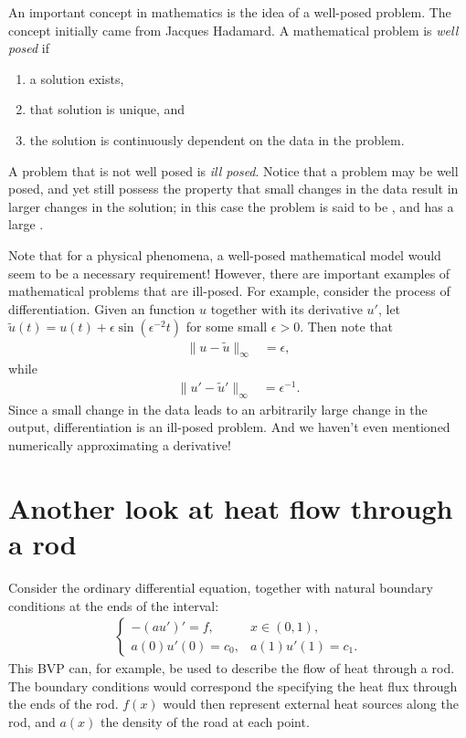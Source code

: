\label{lab:inverse_problems}

An important concept in mathematics is the idea of a well-posed problem. The concept initially came from Jacques Hadamard. A mathematical problem is \textit{well posed} if 
\begin{enumerate}
	\item a solution exists, 
	\item that solution is unique, and 
	\item the solution is continuously dependent on the data in the problem. \label{inverse_problems:continuous_dependence}
\end{enumerate}
A problem that is not well posed is \textit{ill posed}. Notice that a problem may be well posed, and yet still possess the property that small changes in the data result in larger changes in the solution; in this case the problem is said to be , and has a large .

Note that for a physical phenomena, a well-posed mathematical model would seem to be a necessary requirement! However, there are important examples of mathematical problems that are ill-posed. For example, consider the process of differentiation. Given an function $u$ together with its derivative $u'$, let $\tilde{u}(t) = u(t) +  \epsilon \sin(\epsilon^{-2}t)$ for some small $\epsilon > 0$. Then note that 
\begin{align*}
	\|u-\tilde{u}\|_{\infty} &= \epsilon,
\end{align*}
while
\begin{align*}
	\|u'-\tilde{u}'\|_{\infty} &= \epsilon^{-1}.
\end{align*}
Since a small change in the data leads to an arbitrarily large change in the output, differentiation is an ill-posed problem. And we haven't even mentioned numerically approximating a derivative!


\section*{Another look at heat flow through a rod}
Consider the ordinary differential equation, together with natural boundary conditions at the ends of the interval: 
\begin{align}
\begin{cases}
	-(au')' = f, & x \in (0,1),\\
	a(0)u'(0) = c_0, & a(1)u'(1) = c_1.
\end{cases} \label{inverse_problems:heat_flow}
\end{align}
This BVP can, for example, be used to describe the flow of heat through a rod. The boundary conditions would correspond the specifying the heat flux through the ends of the rod. $f(x)$ would then represent external heat sources along the rod, and $a(x)$ the density of the road at each point. 

